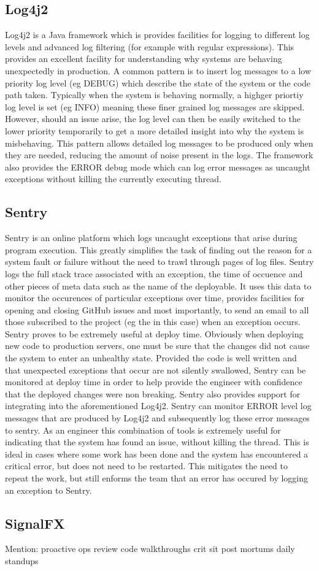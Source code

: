 \subsection{Log4j2}
Log4j2 is a Java framework which is provides facilities for logging to different log levels and advanced log filtering (for example with regular expressions). This provides an excellent facility for understanding why systems are behaving unexpectedly in production. A common pattern is to insert log messages to a low priority log level (eg DEBUG) which describe the state of the system or the code path taken. Typically when the system is behaving normally, a highger priortiy log level is set (eg INFO) meaning these finer grained log messages are skipped. However, should an issue arise, the log level can then be easily switched to the lower priority temporarily to get a more detailed insight into why the system is misbehaving. This pattern allows detailed log messages to be produced only when they are needed, reducing the amount of noise present in the logs. The framework also provides the ERROR debug mode which can log error messages as uncaught exceptions without killing the currently executing thread.

\subsection{Sentry}
Sentry is an online platform which logs uncaught exceptions that arise during program execution. This greatly simplifies the task of finding out the reason for a system fault or failure without the need to trawl through pages of log files. Sentry logs the full stack trace associated with an exception, the time of occuence and other pieces of meta data such as the name of the deployable. It uses this data to monitor the occurences of particular exceptions over time, provides facilities for opening and closing GitHub issues and most importantly, to send an email to all those subscribed to the project (eg the \team{} in this case) when an exception occurs. Sentry proves to be extremely useful at deploy time. Obviously when deploying new code to production servers, one must be sure that the changes did not cause the system to enter an unhealthy state. Provided the code is well written and that unexpected exceptions that occur are not silently swallowed, Sentry can be monitored at deploy time in order to help provide the engineer with confidence that the deployed changes were non breaking. Sentry also provides support for integrating into the aforementioned Log4j2. Sentry can monitor ERROR level log messages that are produced by Log4j2 and subsequently log these error messages to sentry. As an engineer this combination of tools is extremely useful for indicating that the system has found an issue, without killing the thread. This is ideal in cases where some work has been done and the system has encountered a critical error, but does not need to be restarted. This mitigates the need to repeat the work, but still enforms the team that an error has occured by logging an exception to Sentry.

\subsection{SignalFX}


 

Mention:
proactive ops review
code walkthroughs
crit sit post mortums
daily standups